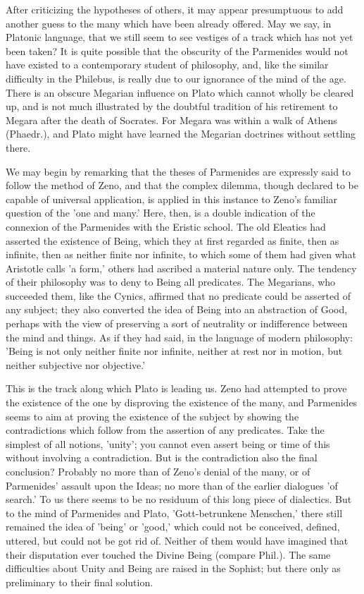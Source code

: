 After criticizing the hypotheses of others, it may appear presumptuous
to add another guess to the many which have been already offered. May we
say, in Platonic language, that we still seem to see vestiges of a track
which has not yet been taken? It is quite possible that the obscurity
of the Parmenides would not have existed to a contemporary student of
philosophy, and, like the similar difficulty in the Philebus, is
really due to our ignorance of the mind of the age. There is an obscure
Megarian influence on Plato which cannot wholly be cleared up, and is
not much illustrated by the doubtful tradition of his retirement to
Megara after the death of Socrates. For Megara was within a walk of
Athens (Phaedr.), and Plato might have learned the Megarian doctrines
without settling there.

We may begin by remarking that the theses of Parmenides are expressly
said to follow the method of Zeno, and that the complex dilemma, though
declared to be capable of universal application, is applied in this
instance to Zeno's familiar question of the 'one and many.' Here, then,
is a double indication of the connexion of the Parmenides with the
Eristic school. The old Eleatics had asserted the existence of Being,
which they at first regarded as finite, then as infinite, then as
neither finite nor infinite, to which some of them had given what
Aristotle calls 'a form,' others had ascribed a material nature only.
The tendency of their philosophy was to deny to Being all predicates.
The Megarians, who succeeded them, like the Cynics, affirmed that no
predicate could be asserted of any subject; they also converted the
idea of Being into an abstraction of Good, perhaps with the view of
preserving a sort of neutrality or indifference between the mind and
things. As if they had said, in the language of modern philosophy:
'Being is not only neither finite nor infinite, neither at rest nor in
motion, but neither subjective nor objective.'

This is the track along which Plato is leading us. Zeno had attempted to
prove the existence of the one by disproving the existence of the many,
and Parmenides seems to aim at proving the existence of the subject
by showing the contradictions which follow from the assertion of any
predicates. Take the simplest of all notions, 'unity'; you cannot even
assert being or time of this without involving a contradiction. But is
the contradiction also the final conclusion? Probably no more than of
Zeno's denial of the many, or of Parmenides' assault upon the Ideas; no
more than of the earlier dialogues 'of search.' To us there seems to
be no residuum of this long piece of dialectics. But to the mind of
Parmenides and Plato, 'Gott-betrunkene Menschen,' there still remained
the idea of 'being' or 'good,' which could not be conceived, defined,
uttered, but could not be got rid of. Neither of them would have
imagined that their disputation ever touched the Divine Being (compare
Phil.). The same difficulties about Unity and Being are raised in the
Sophist; but there only as preliminary to their final solution.

